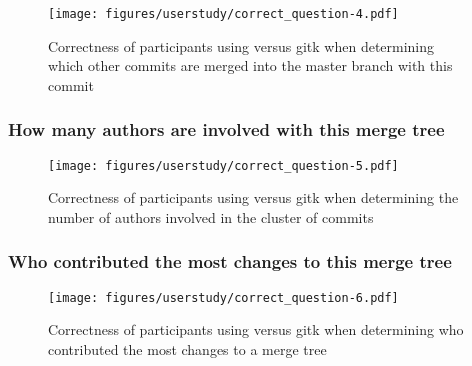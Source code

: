 \begin{figure}[htpb]
  \centering
  \texttt{[image: figures/userstudy/correct\_question-4.pdf]}
  \caption{Correctness of participants using \tool versus gitk when
    determining which other commits are merged into the master branch
    with this commit}
  \label{fig:figures/userstudy/correct_question-4}
\end{figure}

\subsubsection{How many authors are involved with this merge tree}
\label{ssub:how_many_authors_are_involved_with_this_merge_tree}





\begin{figure}[htpb]
  \centering
  \texttt{[image: figures/userstudy/correct\_question-5.pdf]}
  \caption{Correctness of participants using \tool versus gitk when
    determining the number of authors involved in the cluster of commits}
  \label{fig:figures/userstudy/correct_question-5}
\end{figure}

\subsubsection{Who contributed the most changes to this merge tree}
\label{ssub:who_contributed_the_most_changes_to_this_merge_tree}





\begin{figure}[htpb]
  \centering
  \texttt{[image: figures/userstudy/correct\_question-6.pdf]}
  \caption{Correctness of participants using \tool versus gitk when
    determining who contributed the most changes to a merge tree}
  \label{fig:figures/userstudy/correct_question-6}
\end{figure}


